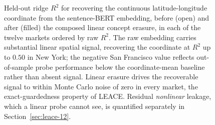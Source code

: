 \begin{figure}[!htbp]
\caption{Held-out ridge $R^2$ for recovering the continuous latitude-longitude
coordinate from the sentence-BERT embedding, before (open) and after (filled)
the composed linear concept erasure, in each of the twelve markets ordered by raw
$R^2$. The raw embedding carries substantial linear spatial signal, recovering
the coordinate at $R^2$ up to $0.50$ in New York; the negative San Francisco
value reflects out-of-sample probe performance below the coordinate-mean
baseline rather than absent signal. Linear erasure drives the recoverable signal
to within Monte Carlo noise of zero in every market, the exact-guardedness
property of LEACE. Residual \emph{nonlinear} leakage, which a linear probe cannot
see, is quantified separately in Section~\ref{sec:leace-12}.}
\label{fig:erasure-12}
\end{figure}

